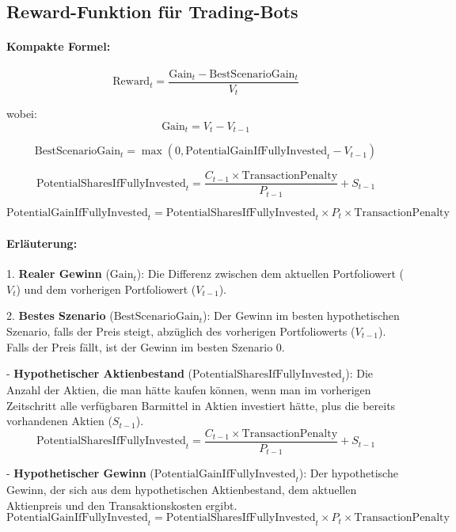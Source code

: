 \subsection{Reward-Funktion für Trading-Bots}

\paragraph{Kompakte Formel:}
\[
\text{Reward}_t = \frac{\text{Gain}_t - \text{BestScenarioGain}_t}{V_t}
\]

wobei:
\[
\text{Gain}_t = V_t - V_{t-1}
\]

\[
\text{BestScenarioGain}_t = \max\left(0, \text{PotentialGainIfFullyInvested}_t - V_{t-1}\right)
\]

\[
\text{PotentialSharesIfFullyInvested}_t = \frac{C_{t-1} \times \text{TransactionPenalty}}{P_{t-1}} + S_{t-1}
\]

\[
\text{PotentialGainIfFullyInvested}_t = \text{PotentialSharesIfFullyInvested}_t \times P_t \times \text{TransactionPenalty}
\]

\paragraph{Erläuterung:}

1. \textbf{Realer Gewinn} (\(\text{Gain}_t\)): Die Differenz zwischen dem aktuellen Portfoliowert (\(V_t\)) und dem vorherigen Portfoliowert (\(V_{t-1}\)).

2. \textbf{Bestes Szenario} (\(\text{BestScenarioGain}_t\)): Der Gewinn im besten hypothetischen Szenario, falls der Preis steigt, abzüglich des vorherigen Portfoliowerts (\(V_{t-1}\)). Falls der Preis fällt, ist der Gewinn im besten Szenario 0.

   - \textbf{Hypothetischer Aktienbestand} (\(\text{PotentialSharesIfFullyInvested}_t\)): Die Anzahl der Aktien, die man hätte kaufen können, wenn man im vorherigen Zeitschritt alle verfügbaren Barmittel in Aktien investiert hätte, plus die bereits vorhandenen Aktien (\(S_{t-1}\)).
     \[
     \text{PotentialSharesIfFullyInvested}_t = \frac{C_{t-1} \times \text{TransactionPenalty}}{P_{t-1}} + S_{t-1}
     \]

   - \textbf{Hypothetischer Gewinn} (\(\text{PotentialGainIfFullyInvested}_t\)): Der hypothetische Gewinn, der sich aus dem hypothetischen Aktienbestand, dem aktuellen Aktienpreis und den Transaktionskosten ergibt.
     \[
     \text{PotentialGainIfFullyInvested}_t = \text{PotentialSharesIfFullyInvested}_t \times P_t \times \text{TransactionPenalty}
     \]

